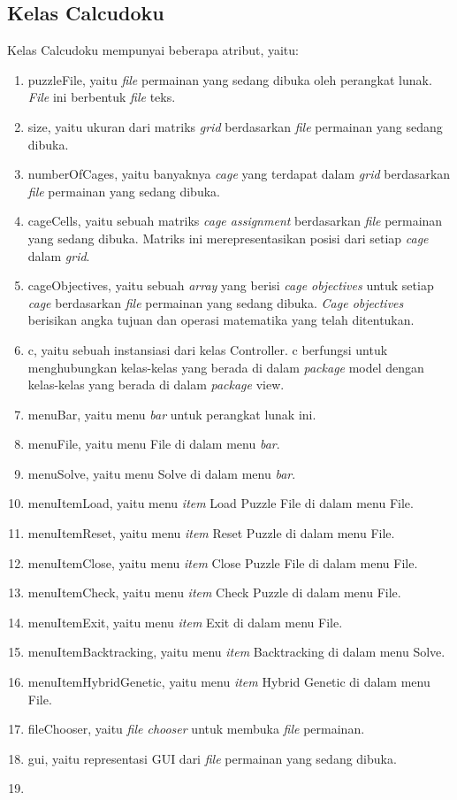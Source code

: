 \subsection{Kelas Calcudoku}
\label{sec:kelascalcudoku}

Kelas Calcudoku mempunyai beberapa atribut, yaitu:

\begin{enumerate}
\item puzzleFile, yaitu \textit{file} permainan yang sedang dibuka oleh perangkat lunak. \textit{File} ini berbentuk \textit{file} teks.
\item size, yaitu ukuran dari matriks \textit{grid} berdasarkan \textit{file} permainan yang sedang dibuka.
\item numberOfCages, yaitu banyaknya \textit{cage} yang terdapat dalam \textit{grid} berdasarkan \textit{file} permainan yang sedang dibuka.
\item cageCells, yaitu sebuah matriks \textit{cage assignment} berdasarkan \textit{file} permainan yang sedang dibuka. Matriks ini merepresentasikan posisi dari setiap \textit{cage} dalam \textit{grid}.
\item cageObjectives, yaitu sebuah \textit{array} yang berisi \textit{cage objectives} untuk setiap \textit{cage} berdasarkan \textit{file} permainan yang sedang dibuka. \textit{Cage objectives} berisikan angka tujuan dan operasi matematika yang telah ditentukan.
\item c, yaitu sebuah instansiasi dari kelas Controller. c berfungsi untuk menghubungkan kelas-kelas yang berada di dalam \textit{package} model dengan kelas-kelas yang berada di dalam \textit{package} view.
\item menuBar, yaitu menu \textit{bar} untuk perangkat lunak ini.
\item menuFile, yaitu menu File di dalam menu \textit{bar}.
\item menuSolve, yaitu menu Solve di dalam menu \textit{bar}.
\item menuItemLoad, yaitu menu \textit{item} Load Puzzle File di dalam menu File.
\item menuItemReset, yaitu menu \textit{item} Reset Puzzle di dalam menu File.
\item menuItemClose, yaitu menu \textit{item} Close Puzzle File di dalam menu File.
\item menuItemCheck, yaitu menu \textit{item} Check Puzzle di dalam menu File.
\item menuItemExit, yaitu menu \textit{item} Exit di dalam menu File.
\item menuItemBacktracking, yaitu menu \textit{item} Backtracking di dalam menu Solve.
\item menuItemHybridGenetic, yaitu menu \textit{item} Hybrid Genetic di dalam menu File.
\item fileChooser, yaitu \textit{file chooser} untuk membuka \textit{file} permainan.
\item gui, yaitu representasi GUI dari \textit{file} permainan yang sedang dibuka.
\item
\end{enumerate}

